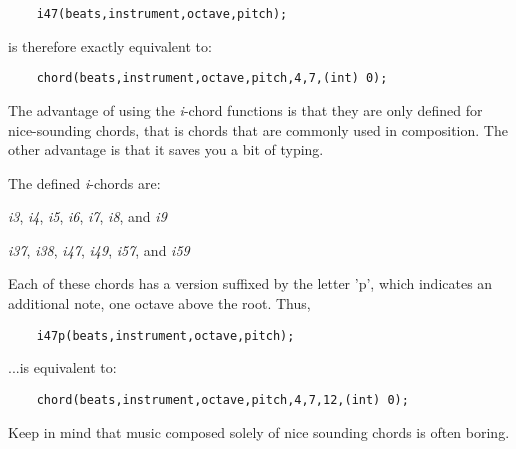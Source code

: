 \documentclass{article}
\begin{document}
\begin{verbatim}
    i47(beats,instrument,octave,pitch);
\end{verbatim}

is therefore exactly equivalent to:

\begin{verbatim}
    chord(beats,instrument,octave,pitch,4,7,(int) 0);
\end{verbatim}

The advantage of using the {\it i}-chord functions is 
that they are only defined for nice-sounding chords,
that is chords that are commonly used in composition.
The other advantage is that it saves you a bit of typing.

The defined {\it i}-chords are:

\begin{center}
    {\it i3}, {\it i4}, {\it i5}, {\it i6}, {\it i7}, {\it i8}, and {\it i9}
\end{center}
\begin{center}
    {\it i37}, {\it i38}, {\it i47}, {\it i49}, {\it i57}, and {\it i59}
\end{center}

Each of these chords has a version suffixed by the
letter 'p', which indicates an additional note, one
octave above the root. Thus,

\begin{verbatim}
    i47p(beats,instrument,octave,pitch);
\end{verbatim}

...is equivalent to:

\begin{verbatim}
    chord(beats,instrument,octave,pitch,4,7,12,(int) 0);
\end{verbatim}

Keep in mind that music composed solely of nice sounding chords is often boring.
\end{document}
